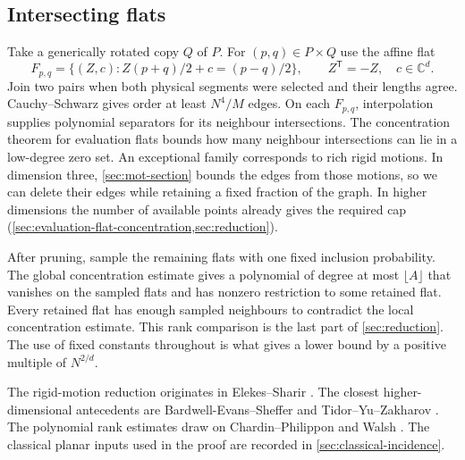 \subsection{Intersecting flats}

Take a generically rotated copy $Q$ of $P$. For $(p,q)\in P\times Q$ use the affine flat
\[
 F_{p,q}=\{(Z,c):Z(p+q)/2+c=(p-q)/2\},
 \qquad Z^{\mathsf T}=-Z,\quad c\in\mathbb{C}^d.
\]
Join two pairs when both physical segments were selected and their lengths agree. Cauchy--Schwarz gives order at least $N^4/M$ edges. On each $F_{p,q}$, interpolation supplies polynomial separators for its neighbour intersections. The concentration theorem for evaluation flats bounds how many neighbour intersections can lie in a low-degree zero set. An exceptional family corresponds to rich rigid motions. In dimension three, \cref{sec:mot-section} bounds the edges from those motions, so we can delete their edges while retaining a fixed fraction of the graph. In higher dimensions the number of available points already gives the required cap (\cref{sec:evaluation-flat-concentration,sec:reduction}).

After pruning, sample the remaining flats with one fixed inclusion probability. The global concentration estimate gives a polynomial of degree at most $\lfloor A\rfloor$ that vanishes on the sampled flats and has nonzero restriction to some retained flat. Every retained flat has enough sampled neighbours to contradict the local concentration estimate. This rank comparison is the last part of \cref{sec:reduction}. The use of fixed constants throughout is what gives a lower bound by a positive multiple of $N^{2/d}$.

The rigid-motion reduction originates in Elekes--Sharir \cite{elekessharir2011}. The closest higher-dimensional antecedents are Bardwell-Evans--Sheffer \cite{BardwellEvansSheffer2019} and Tidor--Yu--Zakharov \cite[Sections~3--6 and~10.2--10.3]{tidoryuzakharov2026}. The polynomial rank estimates draw on Chardin--Philippon and Walsh \cite{chardinphilippon1999,chardinphilippon2002erratum,walsh2020,walsh2023}. The classical planar inputs used in the proof are recorded in \cref{sec:classical-incidence}.
